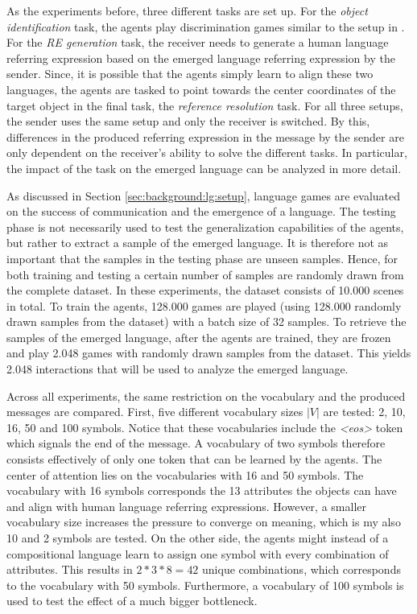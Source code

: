 As the experiments before, three different tasks are set up.
For the \emph{object identification} task, the agents play discrimination games similar to the setup in \citep{Lazaridou2017}.
For the \emph{RE generation} task, the receiver needs to generate a human language referring expression based on the emerged language referring expression by the sender.
Since, it is possible that the agents simply learn to align these two languages, the agents are tasked to point towards the center coordinates of the target object in the final task, the \emph{reference resolution} task.
For all three setups, the sender uses the same setup and only the receiver is switched.
By this, differences in the produced referring expression in the message by the sender are only dependent on the receiver's ability to solve the different tasks.
In particular, the impact of the task on the emerged language can be analyzed in more detail.

As discussed in Section \ref{sec:background:lg:setup}, language games are evaluated on the success of communication and the emergence of a language.
The testing phase is not necessarily used to test the generalization capabilities of the agents, but rather to extract a sample of the emerged language.
It is therefore not as important that the samples in the testing phase are unseen samples.
Hence, for both training and testing a certain number of samples are randomly drawn from the complete dataset.
In these experiments, the dataset consists of 10.000 scenes in total.
To train the agents, 128.000 games are played (using 128.000 randomly drawn samples from the dataset) with a batch size of 32 samples.
To retrieve the samples of the emerged language, after the agents are trained, they are frozen and play 2.048 games with randomly drawn samples from the dataset.
This yields 2.048 interactions that will be used to analyze the emerged language.


Across all experiments, the same restriction on the vocabulary and the produced messages are compared.
First, five different vocabulary sizes $|V|$ are tested: 2, 10, 16, 50 and 100 symbols.
Notice that these vocabularies include the \emph{<eos>} token which signals the end of the message.
A vocabulary of two symbols therefore consists effectively of only one token that can be learned by the agents.
The center of attention lies on the vocabularies with 16 and 50 symbols.
The vocabulary with 16 symbols corresponds the 13 attributes the objects can have and align with human language referring expressions.
However, a smaller vocabulary size increases the pressure to converge on meaning, which is my also 10 and 2 symbols are tested.
On the other side, the agents might instead of a compositional language learn to assign one symbol with every combination of attributes.
This results in $2 * 3 * 8 = 42$ unique combinations, which corresponds to the vocabulary with 50 symbols.
Furthermore, a vocabulary of 100 symbols is used to test the effect of a much bigger bottleneck.

